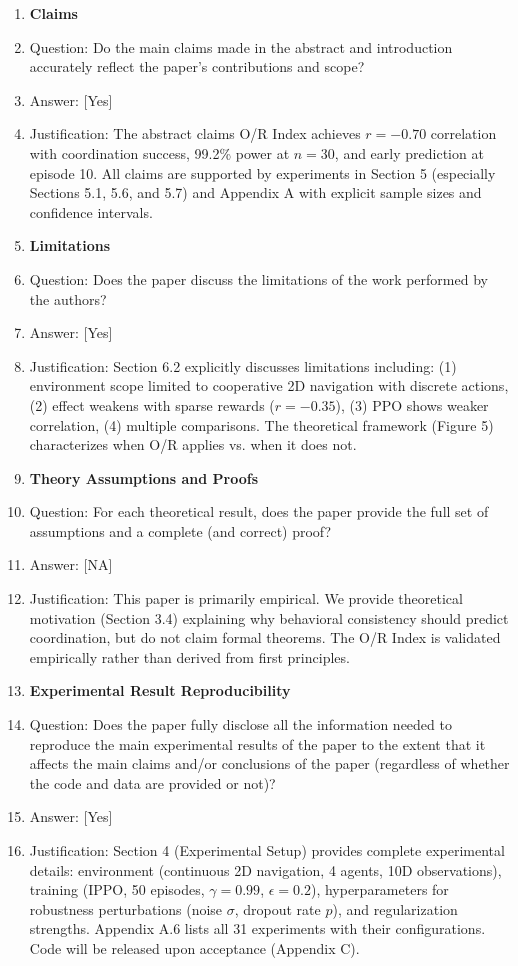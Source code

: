 \documentclass[twoside]{article}
\theoremstyle{remark}
\newcommand{\answerYes}{[Yes]}
\newcommand{\answerNA}{[NA]}
\begin{document}
\begin{enumerate}

\item {\bf Claims}
    \item[] Question: Do the main claims made in the abstract and introduction accurately reflect the paper's contributions and scope?
    \item[] Answer: \answerYes{}
    \item[] Justification: The abstract claims O/R Index achieves $r = -0.70$ correlation with coordination success, 99.2\% power at $n = 30$, and early prediction at episode 10. All claims are supported by experiments in Section 5 (especially Sections 5.1, 5.6, and 5.7) and Appendix A with explicit sample sizes and confidence intervals.

\item {\bf Limitations}
    \item[] Question: Does the paper discuss the limitations of the work performed by the authors?
    \item[] Answer: \answerYes{}
    \item[] Justification: Section 6.2 explicitly discusses limitations including: (1) environment scope limited to cooperative 2D navigation with discrete actions, (2) effect weakens with sparse rewards ($r = -0.35$), (3) PPO shows weaker correlation, (4) multiple comparisons. The theoretical framework (Figure 5) characterizes when O/R applies vs. when it does not.

\item {\bf Theory Assumptions and Proofs}
    \item[] Question: For each theoretical result, does the paper provide the full set of assumptions and a complete (and correct) proof?
    \item[] Answer: \answerNA{}
    \item[] Justification: This paper is primarily empirical. We provide theoretical motivation (Section 3.4) explaining why behavioral consistency should predict coordination, but do not claim formal theorems. The O/R Index is validated empirically rather than derived from first principles.

\item {\bf Experimental Result Reproducibility}
    \item[] Question: Does the paper fully disclose all the information needed to reproduce the main experimental results of the paper to the extent that it affects the main claims and/or conclusions of the paper (regardless of whether the code and data are provided or not)?
    \item[] Answer: \answerYes{}
    \item[] Justification: Section 4 (Experimental Setup) provides complete experimental details: environment (continuous 2D navigation, 4 agents, 10D observations), training (IPPO, 50 episodes, $\gamma = 0.99$, $\epsilon = 0.2$), hyperparameters for robustness perturbations (noise $\sigma$, dropout rate $p$), and regularization strengths. Appendix A.6 lists all 31 experiments with their configurations. Code will be released upon acceptance (Appendix C).


\end{enumerate}
\end{document}
